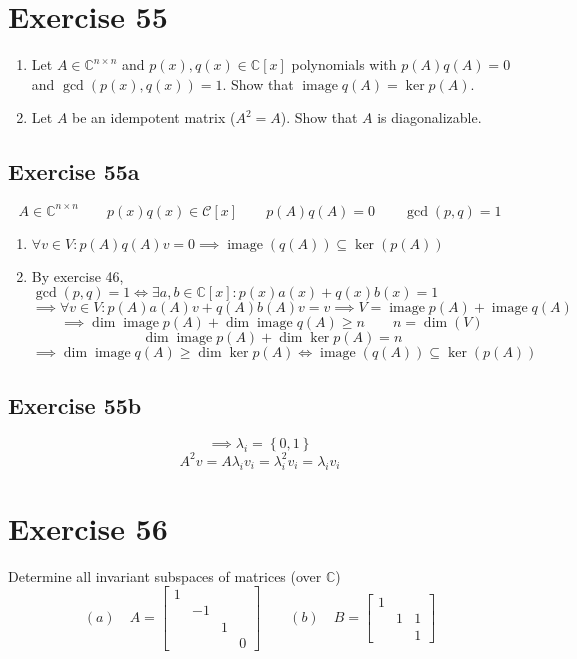 \documentclass[a4paper]{article}
\theoremstyle{definition}
\DeclareMathOperator\image{image}
\newcommand\set[1]{\left\{#1\right\}}
\begin{document}
\section*{Exercise 55}
\begin{ex}
  \begin{enumerate}
    \item Let $A \in \mathbb C^{n \times n}$ and $p(x), q(x) \in \mathbb C[x]$ polynomials with $p(A) q(A) = 0$ and $\operatorname{gcd}(p(x), q(x)) = 1$. Show that $\image{q(A)} = \ker{p(A)}$.
    \item Let $A$ be an idempotent matrix ($A^2 = A$). Show that $A$ is diagonalizable.
  \end{enumerate}
\end{ex}

\subsection{Exercise 55a}

\[ A \in \mathbb C^{n \times n} \qquad p(x) q(x) \in \mathcal C[x] \qquad p(A) q(A) = 0 \qquad \operatorname{gcd}(p,q) = 1 \]
\begin{enumerate}
  \item $\forall v \in V: p(A) q(A) v = 0 \implies \image(q(A)) \subseteq \ker(p(A))$
  \item By exercise 46, $\operatorname{gcd}(p,q) = 1 \iff \exists a, b \in \mathbb C[x]: p(x) a(x) + q(x) b(x) = 1$
    \[ \implies \forall v \in V: p(A) a(A) v + q(A) b(A) v = v \implies V = \image{p(A)} + \image{q(A)} \]
    \[ \implies \dim\image{p(A)} + \dim\image{q(A)} \geq n \qquad n = \dim(V) \]
    \[ \dim{\image{p(A)}} + \dim{\ker{p(A)}} = n \]
    \[ \implies \dim\image{q(A)} \geq \dim\ker{p(A)} \iff \image(q(A)) \subseteq \ker(p(A)) \]
\end{enumerate}

\subsection{Exercise 55b}
\[ \implies \lambda_i = \set{0, 1} \]
\[ A^2 v = A \lambda_i v_i = \lambda_i^2 v_i = \lambda_i v_i \]

\section*{Exercise 56}
\begin{ex}
  Determine all invariant subspaces of matrices (over $\mathbb C$)
  \[
    (a) \quad A = \begin{bmatrix} 1 & & & \\ & -1 & & \\ & & 1 & \\ & & & 0 \end{bmatrix} \qquad
    (b) \quad B = \begin{bmatrix} 1 & & \\ & 1 & 1 \\ & & 1 \end{bmatrix}
  \]
\end{ex}
\end{document}
